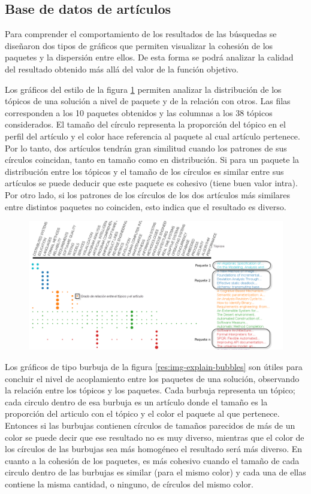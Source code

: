 \subsection{Base de datos de artículos}
Para comprender el comportamiento de los resultados de las búsquedas se diseñaron dos tipos de gráficos que permiten visualizar la cohesión de los paquetes y la dispersión entre ellos. De esta forma se podrá analizar la calidad del resultado obtenido más allá del valor de la función objetivo.

Los gráficos del estilo de la figura \ref{res:img-explain-bars} permiten analizar la distribución de los tópicos de una solución a nivel de paquete y de la relación con otros. Las filas corresponden a los 10 paquetes obtenidos y las columnas a los 38 tópicos considerados. El tamaño del círculo representa la proporción del tópico en el perfil del artículo y el color hace referencia al paquete al cual artículo pertenece. Por lo tanto, dos artículos tendrán gran similitud cuando los patrones de sus círculos coincidan, tanto en tamaño como en distribución. Si para un paquete la distribución entre los tópicos y el tamaño de los círculos es similar entre sus artículos se puede deducir que este paquete es cohesivo (tiene buen valor intra). Por otro lado, si los patrones de los círculos de los dos artículos más similares entre distintos paquetes no coinciden, esto indica que el resultado es diverso.
\begin{figure}[H]
  \centering
    \includegraphics[width=1\textwidth]{img/explain-bars.png}
  \caption{}
  \label{res:img-explain-bars}
\end{figure}

Los gráficos de tipo burbuja de la figura \ref{res:img-explain-bubbles} son útiles para concluir el nivel de acoplamiento entre los paquetes de una solución, observando la relación entre los tópicos y los paquetes. Cada burbuja representa un tópico; cada circulo dentro de esa burbuja es un artículo donde el tamaño es la proporción del articulo con el tópico y el color el paquete al que pertenece. Entonces si las burbujas contienen círculos de tamaños parecidos de más de un color se puede decir que ese resultado no es muy diverso, mientras que el color de los círculos de las burbujas sea más homogéneo el resultado será más diverso. En cuanto a la cohesión de los paquetes, es más cohesivo cuando el tamaño de cada circulo dentro de las burbujas es similar (para el mismo color) y cada una de ellas contiene la misma cantidad, o ninguno, de círculos del mismo color.

